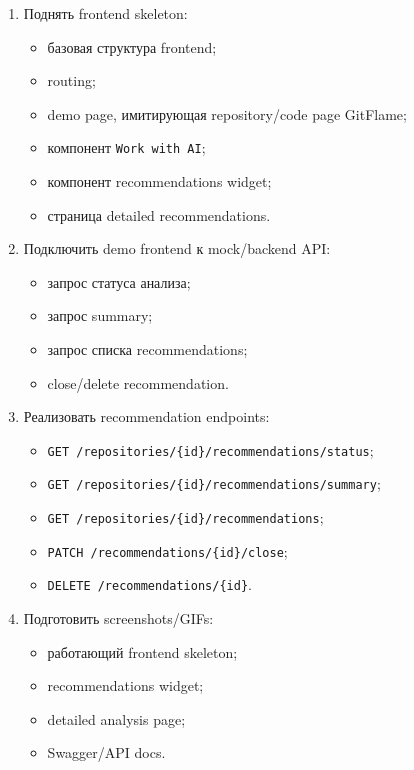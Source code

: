 \documentclass[12pt,a4paper]{article}
\begin{document}
\begin{enumerate}
    \item Поднять frontend skeleton:
    \begin{itemize}
        \item базовая структура frontend;
        \item routing;
        \item demo page, имитирующая repository/code page GitFlame;
        \item компонент \texttt{Work with AI};
        \item компонент recommendations widget;
        \item страница detailed recommendations.
    \end{itemize}

    \item Подключить demo frontend к mock/backend API:
    \begin{itemize}
        \item запрос статуса анализа;
        \item запрос summary;
        \item запрос списка recommendations;
        \item close/delete recommendation.
    \end{itemize}

    \item Реализовать recommendation endpoints:
    \begin{itemize}
        \item \texttt{GET /repositories/\{id\}/recommendations/status};
        \item \texttt{GET /repositories/\{id\}/recommendations/summary};
        \item \texttt{GET /repositories/\{id\}/recommendations};
        \item \texttt{PATCH /recommendations/\{id\}/close};
        \item \texttt{DELETE /recommendations/\{id\}}.
    \end{itemize}

    \item Подготовить screenshots/GIFs:
    \begin{itemize}
        \item работающий frontend skeleton;
        \item recommendations widget;
        \item detailed analysis page;
        \item Swagger/API docs.
    \end{itemize}
\end{enumerate}
\end{document}
